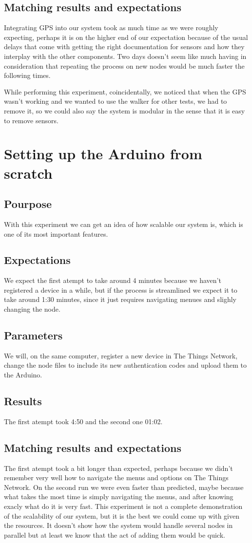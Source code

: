 	\subsection{Matching results and expectations}
	Integrating GPS into our system took as much time as we were roughly expecting, perhaps it is on the higher end of our expectation because of the usual delays that come with getting the right documentation for sensors and how they interplay with the other components. Two days doesn't seem like much having in consideration that repeating the process on new nodes would be much faster the following times.

	While performing this experiment, coincidentally, we noticed that when the GPS wasn't working and we wanted to use the walker for other tests, we had to remove it, so we could also say the system is modular in the sense that it is easy to remove sensors.

\section{Setting up the Arduino from scratch}

	\subsection{Pourpose}
		With this experiment we can get an idea of how scalable our system is, which is one of its most important features.
	\subsection{Expectations}
		We expect the first atempt to take around 4 minutes because we haven't registered a device in a while, but if the process is streamlined we expect it to take around 1:30 minutes, since it just requires navigating menues and slighly changing the node.
	\subsection{Parameters}
		We will, on the same computer, register a new device in The Things Network, change the node files to include its new authentication codes and upload them to the Arduino.
	\subsection{Results}
		The first atempt took 4:50 and the second one 01:02.
	\subsection{Matching results and expectations}
		The first atempt took a bit longer than expected, perhaps because we didn't remember very well how to navigate the menus and options on The Things Network. On the second run we were even faster than predicted, maybe because what takes the most time is simply navigating the menus, and after knowing exacly what do it is very fast. This experiment is not a complete demonstration of the scalability of our system, but it is the best we could come up with given the resources. It doesn't show how the system would handle several nodes in parallel but at least we know that the act of adding them would be quick.

